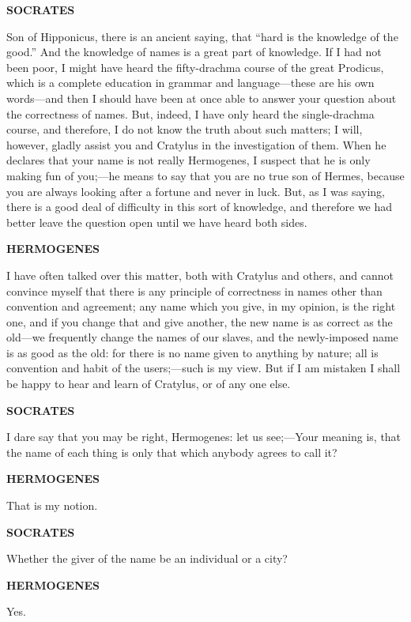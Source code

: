 \documentclass[11pt,letter]{article}
\begin{document}
\par \textbf{SOCRATES}
\par   Son of Hipponicus, there is an ancient saying, that “hard is the knowledge of the good.” And the knowledge of names is a great part of knowledge. If I had not been poor, I might have heard the fifty-drachma course of the great Prodicus, which is a complete education in grammar and language—these are his own words—and then I should have been at once able to answer your question about the correctness of names. But, indeed, I have only heard the single-drachma course, and therefore, I do not know the truth about such matters; I will, however, gladly assist you and Cratylus in the investigation of them. When he declares that your name is not really Hermogenes, I suspect that he is only making fun of you;—he means to say that you are no true son of Hermes, because you are always looking after a fortune and never in luck. But, as I was saying, there is a good deal of difficulty in this sort of knowledge, and therefore we had better leave the question open until we have heard both sides.

\par \textbf{HERMOGENES}
\par   I have often talked over this matter, both with Cratylus and others, and cannot convince myself that there is any principle of correctness in names other than convention and agreement; any name which you give, in my opinion, is the right one, and if you change that and give another, the new name is as correct as the old—we frequently change the names of our slaves, and the newly-imposed name is as good as the old:  for there is no name given to anything by nature; all is convention and habit of the users;—such is my view. But if I am mistaken I shall be happy to hear and learn of Cratylus, or of any one else.

\par \textbf{SOCRATES}
\par   I dare say that you may be right, Hermogenes:  let us see;—Your meaning is, that the name of each thing is only that which anybody agrees to call it?

\par \textbf{HERMOGENES}
\par   That is my notion.

\par \textbf{SOCRATES}
\par   Whether the giver of the name be an individual or a city?

\par \textbf{HERMOGENES}
\par   Yes.
\end{document}
